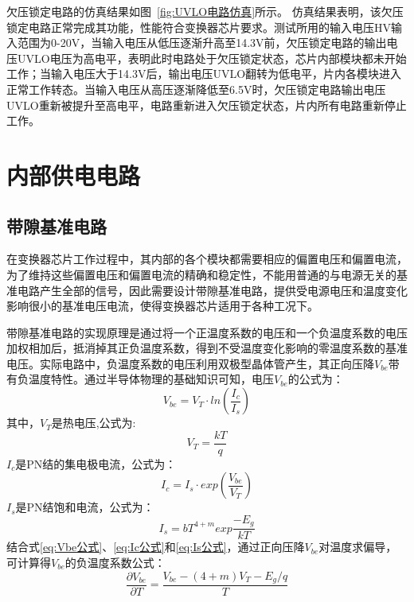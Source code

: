 欠压锁定电路的仿真结果如图~\ref{fig:UVLO电路仿真}所示。
仿真结果表明，该欠压锁定电路正常完成其功能，性能符合变换器芯片要求。测试所用的输入电压HV输入范围为0-20V，当输入电压从低压逐渐升高至14.3V前，欠压锁定电路的输出电压UVLO电压为高电平，表明此时电路处于欠压锁定状态，芯片内部模块都未开始工作；当输入电压大于14.3V后，输出电压UVLO翻转为低电平，片内各模块进入正常工作转态。当输入电压从高压逐渐降低至6.5V时，欠压锁定电路输出电压UVLO重新被提升至高电平，电路重新进入欠压锁定状态，片内所有电路重新停止工作。



\iffalse
\section{内部供电电路}

\subsection{带隙基准电路}

在变换器芯片工作过程中，其内部的各个模块都需要相应的偏置电压和偏置电流，为了维持这些偏置电压和偏置电流的精确和稳定性，不能用普通的与电源无关的基准电路产生全部的信号，因此需要设计带隙基准电路，提供受电源电压和温度变化影响很小的基准电压电流，使得变换器芯片适用于各种工况下。

带隙基准电路的实现原理是通过将一个正温度系数的电压和一个负温度系数的电压加权相加后，抵消掉其正负温度系数，得到不受温度变化影响的零温度系数的基准电压。实际电路中，负温度系数的电压利用双极型晶体管产生，其正向压降$V_{be}$带有负温度特性。通过半导体物理的基础知识可知，电压$V_{be}$的公式为：
\begin{equation}
    \label{eq:Vbe公式}
    V_{be} = V_T \cdot ln(\frac{I_c}{I_s})
\end{equation}
其中，$V_T$是热电压,公式为:
\begin{equation}
    \label{eq:VT公式}
    V_T=\frac{kT}{q}
\end{equation}
$I_c$是PN结的集电极电流，公式为：
\begin{equation}
    \label{eq:Ic公式}
    I_c=I_s \cdot exp(\frac{V_{be}}{V_T})
\end{equation}
$I_s$是PN结饱和电流，公式为：
\begin{equation}
    \label{eq:Is公式}
    I_s=bT^{4+m} exp\frac{-E_g}{kT}
\end{equation}
结合式\eqref{eq:Vbe公式}、\eqref{eq:Ic公式}和\eqref{eq:Is公式}，通过正向压降$V_{be}$对温度求偏导，可计算得$V_{be}$的负温度系数公式：
\begin{equation}
    \label{eq:Vbe/T公式}
    \frac{\partial V_{be}}{\partial T} = \frac{ V_{be} - (4+m)V_T - E_g/q}{T}
\end{equation}

